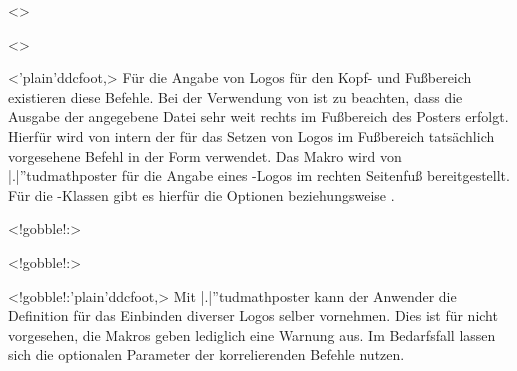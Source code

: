 \begin{DeclareEntity}{}
\begin{NoIndexDefault}
\begin{Declaration}
  {}
  <>
\begin{Declaration}
  {}
  <>
\begin{Declaration}
  {}
  <\Option'plain'{ddcfoot},>
\printdeclarationlist
%
Für die Angabe von Logos für den Kopf- und Fußbereich existieren diese Befehle. 
Bei der Verwendung von  ist zu 
beachten, dass die Ausgabe der angegebene Datei sehr weit rechts im Fußbereich 
des Posters erfolgt. Hierfür wird von \TUDScript intern der für das Setzen von 
Logos im Fußbereich tatsächlich vorgesehene Befehl in der Form 
verwendet. Das Makro  wird von \Class|.|''{tudmathposter} 
für die Angabe eines \DDC-Logos im rechten Seitenfuß bereitgestellt. Für die 
\TUDScript-Klassen gibt es hierfür die Optionen  beziehungsweise 
.
\end{Declaration}
\end{Declaration}
\end{Declaration}

\begin{Declaration}
  {}
  <!gobble!:>
\begin{Declaration}
  {}
  <!gobble!:>
\begin{Declaration}
  {}
  <!gobble!:\Option'plain'{ddcfoot},>
\printdeclarationlist
%
Mit \Class|.|''{tudmathposter} kann der Anwender die Definition für das 
Einbinden diverser Logos selber vornehmen. Dies ist für \TUDScript nicht 
vorgesehen, die Makros geben lediglich eine Warnung aus. Im Bedarfsfall lassen 
sich die optionalen Parameter der korrelierenden Befehle nutzen. 
\end{Declaration}
\end{Declaration}
\end{Declaration}


\end{NoIndexDefault}
\end{DeclareEntity}

